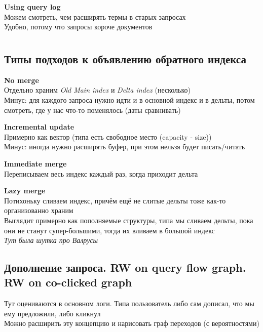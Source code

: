 \documentclass[12pt]{article}
\begin{document}
    \smallskip\smallskip
    {\bf Using query log}\\
      Можем смотреть, чем расширять термы в старых запросах\\
      Удобно, потому что запросы короче документов

\pagebreak %

\section{} %

  \subsection{Типы подходов к объявлению обратного индекса}
    {\bf No merge}\\
      Отдельно храним \textit{Old Main index} и \textit{Delta index} (несколько)\\
      Минус: для каждого запроса нужно идти и в основной индекс и в дельты, потом смотреть, где у нас что-то поменялось (даты сравнивать)

    \smallskip\smallskip
    {\bf Incremental update}\\
      Примерно как вектор (типа есть свободное место (capacity - size))\\
      Минус: иногда нужно расширять буфер, при этом нельзя будет писать/читать

    \smallskip\smallskip
    {\bf Immediate merge}\\
      Переписываем весь индекс каждый раз, когда приходит дельта

    \smallskip\smallskip
    {\bf Lazy merge}\\
      Потихоньку сливаем индекс, причём ещё не слитые дельты тоже как-то организованно храним\\
      Выглядит примерно как пополняемые структуры, типа мы сливаем дельты, пока они не станут супер-большими, тогда их вливаем в большой индекс\\
      \textit{Тут была шутка про Валрусы}
    \pagebreak

  \subsection{Дополнение запроса. RW on query flow graph. RW on co-clicked graph}
    Тут оцениваются в основном логи. Типа пользователь либо сам дописал, что мы ему предложили, либо кликнул\\
    Можно расширить эту концепцию и нарисовать граф переходов (с вероятностями)
\end{document}

